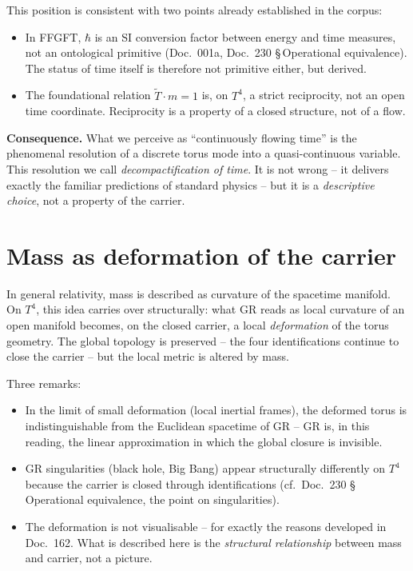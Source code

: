 This position is consistent with two points already established in
the corpus:

\begin{itemize}[leftmargin=2em,itemsep=4pt,topsep=4pt]
  \item In FFGFT, $\hbar$ is an SI conversion factor between energy
        and time measures, not an ontological primitive
        (Doc.~001a, Doc.~230 §\,Operational equivalence). The status
        of time itself is therefore not primitive either, but
        derived.
  \item The foundational relation $\tilde T \cdot m = 1$ is, on
        $T^4$, a strict reciprocity, not an open time coordinate.
        Reciprocity is a property of a closed structure, not of a
        flow.
\end{itemize}

\textbf{Consequence.} What we perceive as ``continuously flowing
time'' is the phenomenal resolution of a discrete torus mode into a
quasi-continuous variable. This resolution we call \emph{decompactification
of time}. It is not wrong -- it delivers exactly the familiar
predictions of standard physics -- but it is a \emph{descriptive
choice}, not a property of the carrier.

\section{Mass as deformation of the carrier}

In general relativity, mass is described as curvature of the
spacetime manifold. On $T^4$, this idea carries over structurally:
what GR reads as local curvature of an open manifold becomes, on the
closed carrier, a local \emph{deformation} of the torus geometry. The
global topology is preserved -- the four identifications continue to
close the carrier -- but the local metric is altered by mass.

Three remarks:

\begin{itemize}[leftmargin=2em,itemsep=4pt,topsep=4pt]
  \item In the limit of small deformation (local inertial frames),
        the deformed torus is indistinguishable from the Euclidean
        spacetime of GR -- GR is, in this reading, the linear
        approximation in which the global closure is invisible.
  \item GR singularities (black hole, Big Bang) appear structurally
        differently on $T^4$ because the carrier is closed through
        identifications (cf.\ Doc.~230 §\,Operational equivalence,
        the point on singularities).
  \item The deformation is not visualisable -- for exactly the
        reasons developed in Doc.~162. What is described here is the
        \emph{structural relationship} between mass and carrier, not
        a picture.
\end{itemize}

